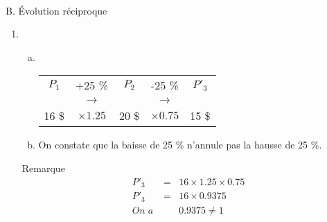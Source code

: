 \documentclass[xcolor={dvipsnames}]{beamer}
\begin{document}
\begin{frame}
\

B. \'Evolution réciproque \pause


	\begin{enumerate}[1.]
		\item 
		\begin{enumerate}[a.]
			\item \ 
			\begin{table}[h!]
				\centering{\ }
				\begin{tabular}{|@{\ \ }c@{\ \ }c@{\ \ }c@{\ \ }c@{\ \ }c@{\ \ }|}
					\hline
					$P_1$ & +\num{25} \%  & $P_2$ & -\num{25} \%  & $P'_3$ \\
					& {\LARGE$\rightarrow$} &	&	 {\LARGE$\rightarrow$} &	\\
					\num{16} \$ & $\times \num{1.25} $ & 20 \$ &  $\times \num{0.75}$ & \num{15} \$ \\
					\hline
				\end{tabular}
				
			\end{table}\pause
			
			\item On constate que la baisse de \num{25} \% n'annule pas la hausse de \num{25} \%.\pause
		\end{enumerate}
		
		\begin{block}{Remarque}
			\begin{eqnarray*}
				P'_3 &=& \num{16} \times \num{1.25} \times \num{0.75} \\
				P'_3 &=& \num{16} \times \num{0.9375} \\
				On\;a\; & &\num{0.9375} \neq 1
			\end{eqnarray*}
		\end{block}
		

	\end{enumerate}
\end{frame}
\end{document}
